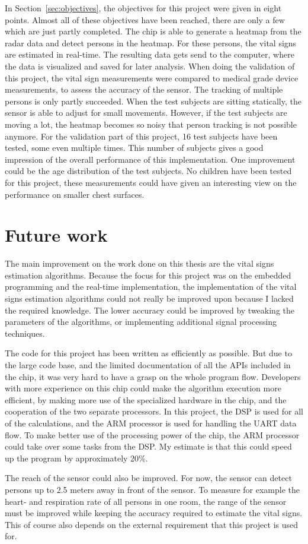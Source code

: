 In Section~\ref{sec:objectives}, the objectives for this project were given in eight points. Almost all of these objectives have been reached, there are only a few which are just partly completed. The chip is able to generate a heatmap from the radar data and detect persons in the heatmap. For these persons, the vital signs are estimated in real-time. The resulting data gets send to the computer, where the data is visualized and saved for later analysis. When doing the validation of this project, the vital sign measurements were compared to medical grade device measurements, to assess the accuracy of the sensor. The tracking of multiple persons is only partly succeeded. When the test subjects are sitting statically, the sensor is able to adjust for small movements. However, if the test subjects are moving a lot, the heatmap becomes so noisy that person tracking is not possible anymore. For the validation part of this project, 16 test subjects have been tested, some even multiple times. This number of subjects gives a good impression of the overall performance of this implementation. One improvement could be the age distribution of the test subjects. No children have been tested for this project, these measurements could have given an interesting view on the performance on smaller chest surfaces.

\section{Future work}
The main improvement on the work done on this thesis are the vital signs estimation algorithms. Because the focus for this project was on the embedded programming and the real-time implementation, the implementation of the vital signs estimation algorithms could not really be improved upon because I lacked the required knowledge. The lower accuracy could be improved by tweaking the parameters of the algorithms, or implementing additional signal processing techniques. 

The code for this project has been written as efficiently as possible. But due to the large code base, and the limited documentation of all the APIs included in the chip, it was very hard to have a grasp on the whole program flow. Developers with more experience on this chip could make the algorithm execution more efficient, by making more use of the specialized hardware in the chip, and the cooperation of the two separate processors. In this project, the DSP is used for all of the calculations, and the ARM processor is used for handling the UART data flow. To make better use of the processing power of the chip, the ARM processor could take over some tasks from the DSP. My estimate is that this could speed up the program by approximately 20\%.

The reach of the sensor could also be improved. For now, the sensor can detect persons up to 2.5 meters away in front of the sensor. To measure for example the heart- and respiration rate of all persons in one room, the range of the sensor must be improved while keeping the accuracy required to estimate the vital signs. This of course also depends on the external requirement that this project is used for.